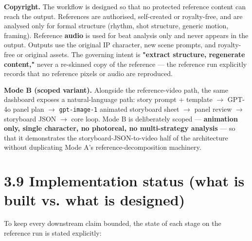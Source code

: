 \documentclass[10pt,twocolumn,letterpaper]{article}
\begin{document}
\textbf{Copyright.} The workflow is designed so that no protected reference content can reach the output. References are authorised, self-created or royalty-free, and are analysed only for formal structure (rhythm, shot structure, generic motion, framing). Reference \textbf{audio} is used for beat analysis only and never appears in the output. Outputs use the original IP character, new scene prompts, and royalty-free or original assets. The governing intent is \textbf{"extract structure, regenerate content,"} never a re-skinned copy of the reference --- the reference run explicitly records that no reference pixels or audio are reproduced.

\textbf{Mode B (scoped variant).} Alongside the reference-video path, the same dashboard exposes a natural-language path: story prompt + template $\rightarrow$ GPT-4o panel plan $\rightarrow$ \texttt{gpt-image-1} animated storyboard sheet $\rightarrow$ panel review $\rightarrow$ storyboard JSON $\rightarrow$ core loop. Mode B is deliberately scoped --- \textbf{animation only, single character, no photoreal, no multi-strategy analysis} --- so that it demonstrates the storyboard-JSON-to-video half of the architecture without duplicating Mode A's reference-decomposition machinery.


\section*{3.9 Implementation status (what is built vs. what is designed)}

To keep every downstream claim bounded, the state of each stage on the reference run is stated explicitly:
\end{document}
